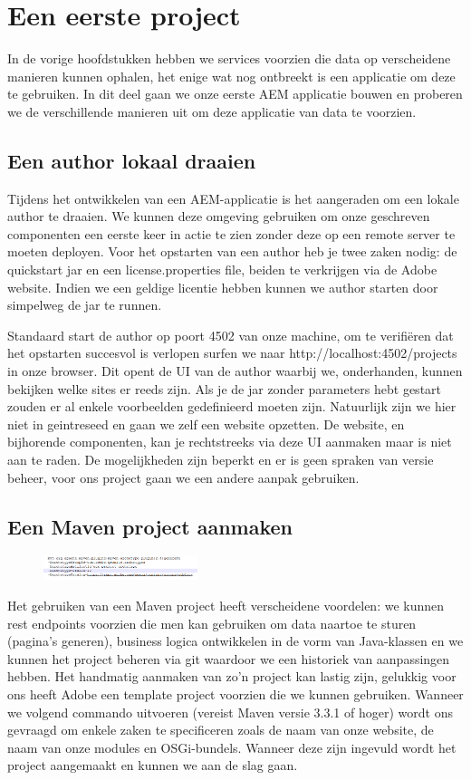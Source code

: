\documentclass{article}
\begin{document}
	\section{Een eerste project}
	In de vorige hoofdstukken hebben we services voorzien die data op verscheidene manieren kunnen ophalen, het enige wat nog ontbreekt is een applicatie om deze te gebruiken. In dit deel gaan we onze eerste AEM applicatie bouwen en proberen we de verschillende manieren uit om deze applicatie van data te voorzien.
	\subsection{Een author lokaal draaien}
	Tijdens het ontwikkelen van een AEM-applicatie is het aangeraden om een lokale author te draaien. We kunnen deze omgeving gebruiken om onze geschreven componenten een eerste keer in actie te zien zonder deze op een remote server te moeten deployen. Voor het opstarten van een author heb je twee zaken nodig: de quickstart jar en een license.properties file, beiden te verkrijgen via de Adobe website. Indien we een geldige licentie hebben kunnen we author starten door simpelweg de jar te runnen.
	\par
	Standaard start de author op poort 4502 van onze machine, om te verifiëren dat het opstarten succesvol is verlopen surfen we naar http://localhost:4502/projects in onze browser. Dit opent de UI van de author waarbij we, onderhanden, kunnen bekijken welke sites er reeds zijn. Als je de jar zonder parameters hebt gestart zouden er al enkele voorbeelden gedefinieerd moeten zijn. Natuurlijk zijn we hier niet in geintreseed en gaan we zelf een website opzetten. De website, en bijhorende componenten, kan je rechtstreeks via deze UI aanmaken maar is niet aan te raden. De mogelijkheden zijn beperkt en er is geen spraken van versie beheer, voor ons project gaan we een andere aanpak gebruiken.
	\subsection{Een Maven project aanmaken}
	\begin{figure}
  		\includegraphics[width=0.4\textwidth]{images/maven-archetype.PNG}
	\end{figure}
	Het gebruiken van een Maven project heeft verscheidene voordelen: we kunnen rest endpoints voorzien die men kan gebruiken om data naartoe te sturen (pagina's generen), business logica ontwikkelen in de vorm van Java-klassen en we kunnen het project beheren via git waardoor we een historiek van aanpassingen hebben. Het handmatig aanmaken van zo'n project kan lastig zijn, gelukkig voor ons heeft Adobe een template project voorzien die we kunnen gebruiken.
Wanneer we volgend commando uitvoeren (vereist Maven versie 3.3.1 of hoger) wordt ons gevraagd om enkele zaken te specificeren zoals de naam van onze website, de naam van onze modules en OSGi-bundels. Wanneer deze zijn ingevuld wordt het project aangemaakt en kunnen we aan de slag gaan.
\end{document}
